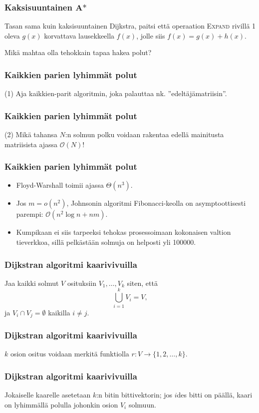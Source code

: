 \documentclass{beamer}
\begin{document}
\begin{frame}
  \frametitle{Kaksisuuntainen A$\ast$}
  Tasan sama kuin kaksisuuntainen Dijkstra, paitsi että operaation \textsc{Expand} rivillä 1 oleva $g(x)$ korvattava lausekkeella $f(x)$, jolle siis $f(x) = g(x) + h(x)$.
\end{frame}

\begin{frame}
  Mikä mahtaa olla tehokkain tapaa hakea polut?
\end{frame}

\begin{frame}
  \frametitle{Kaikkien parien lyhimmät polut}
  (1) Aja kaikkien-parit algoritmin, joka palauttaa nk. ''edeltäjämatriisin''.
\end{frame}

\begin{frame}
  \frametitle{Kaikkien parien lyhimmät polut}
  (2) Mikä tahansa $N$:n solmun polku voidaan rakentaa edellä mainitusta matriisista ajassa $\mathcal{O}(N)$!
\end{frame}

\begin{frame}
  \frametitle{Kaikkien parien lyhimmät polut}
  \begin{itemize}
    \item Floyd-Warshall toimii ajassa $\Theta(n^3)$.
    \item Jos $m = o(n^2)$, Johnsonin algoritmi Fibonacci-keolla on asymptoottisesti parempi: $\mathcal{O}(n^2 \log n + nm)$.
    \item Kumpikaan ei siis tarpeeksi tehokas prosessoimaan kokonaisen valtion tieverkkoa, sillä pelkästään solmuja on helposti yli 100000.
  \end{itemize}
\end{frame}

\begin{frame}
  \frametitle{Dijkstran algoritmi kaarivivuilla}
    Jaa kaikki solmut $V$ osituksiin $V_1, \dots, V_k$ siten, että
    \[
      \bigcup_{i = 1}^k V_i = V,
    \]
    ja $V_i \cap V_j = \emptyset$ kaikilla $i \neq j$.
\end{frame}

\begin{frame}
  \frametitle{Dijkstran algoritmi kaarivivuilla}
  $k$ osion ositus voidaan merkitä funktiolla $r \colon V \to \{ 1, 2, \dots, k\}$.
\end{frame}

\begin{frame}
  \frametitle{Dijkstran algoritmi kaarivivuilla}
  Jokaiselle kaarelle asetetaan $k$:n bitin bittivektorin; jos $i$des bitti on päällä, kaari on lyhimmällä polulla johonkin osion $V_i$ solmuun.
\end{frame}
\end{document}
